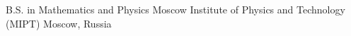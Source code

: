 
\begin{cventries}

  \cventry
    {B.S. in Mathematics and Physics}
    {Moscow Institute of Physics and Technology (MIPT)}
    {Moscow, Russia}
    {}
    {
      \begin{cvitems}
      \end{cvitems}
    }
\end{cventries}
